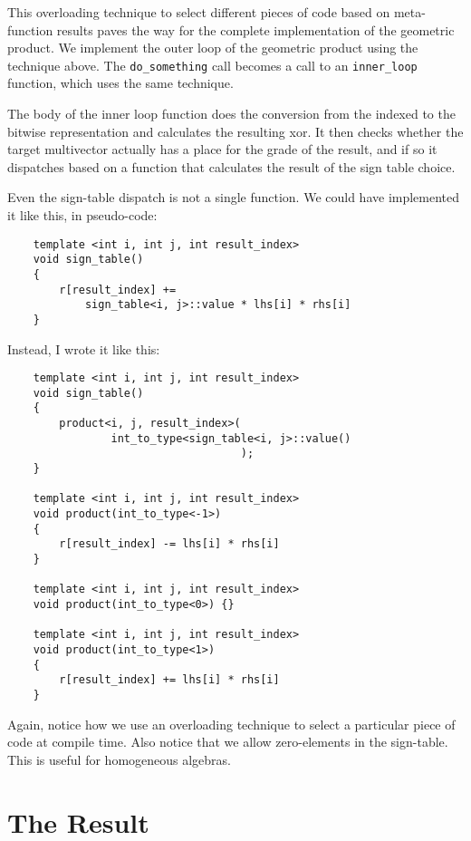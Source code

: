 \documentclass[10pt]{article}
\begin{document}
This overloading technique to select different pieces of code
based on meta-function results paves the way for the complete
implementation of the geometric product. We implement the outer
loop of the geometric product using the technique above. The
\verb"do_something" call becomes a call to an \verb"inner_loop"
function, which uses the same technique.

The body of the inner loop function does the conversion from the
indexed to the bitwise representation and calculates the resulting
xor. It then checks whether the target multivector actually has a
place for the grade of the result, and if so it dispatches based
on a function that calculates the result of the sign table choice.

Even the sign-table dispatch is not a single function. We could
have implemented it like this, in pseudo-code:
\begin{verbatim}
    template <int i, int j, int result_index>
    void sign_table()
    {
        r[result_index] +=
            sign_table<i, j>::value * lhs[i] * rhs[i]
    }
\end{verbatim}
Instead, I wrote it like this:
\begin{verbatim}
    template <int i, int j, int result_index>
    void sign_table()
    {
        product<i, j, result_index>(
                int_to_type<sign_table<i, j>::value()
                                    );
    }

    template <int i, int j, int result_index>
    void product(int_to_type<-1>)
    {
        r[result_index] -= lhs[i] * rhs[i]
    }

    template <int i, int j, int result_index>
    void product(int_to_type<0>) {}

    template <int i, int j, int result_index>
    void product(int_to_type<1>)
    {
        r[result_index] += lhs[i] * rhs[i]
    }
\end{verbatim}

Again, notice how we use an overloading technique to select a
particular piece of code at compile time. Also notice that we
allow zero-elements in the sign-table. This is useful for
homogeneous algebras.

\section{The Result}
\end{document}
